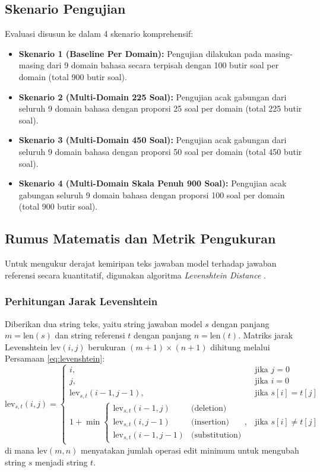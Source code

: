\documentclass[10pt,a4paper]{article}
\begin{document}
\subsection{Skenario Pengujian}
Evaluasi disusun ke dalam 4 skenario komprehensif:
\begin{itemize}\setlength{\itemsep}{0pt}\setlength{\parskip}{0pt}
    \item \textbf{Skenario 1 (Baseline Per Domain):} Pengujian dilakukan pada masing-masing dari 9 domain bahasa secara terpisah dengan 100 butir soal per domain (total 900 butir soal).
    \item \textbf{Skenario 2 (Multi-Domain 225 Soal):} Pengujian acak gabungan dari seluruh 9 domain bahasa dengan proporsi 25 soal per domain (total 225 butir soal).
    \item \textbf{Skenario 3 (Multi-Domain 450 Soal):} Pengujian acak gabungan dari seluruh 9 domain bahasa dengan proporsi 50 soal per domain (total 450 butir soal).
    \item \textbf{Skenario 4 (Multi-Domain Skala Penuh 900 Soal):} Pengujian acak gabungan seluruh 9 domain bahasa dengan proporsi 100 soal per domain (total 900 butir soal).
\end{itemize}

\subsection{Rumus Matematis dan Metrik Pengukuran}
Untuk mengukur derajat kemiripan teks jawaban model terhadap jawaban referensi secara kuantitatif, digunakan algoritma \textit{Levenshtein Distance} \cite{beernaerts2019method, berger2021levenshtein, petty2022new, sandamette2025penerapan}.

\subsubsection{Perhitungan Jarak Levenshtein}
Diberikan dua string teks, yaitu string jawaban model $s$ dengan panjang $m = \text{len}(s)$ dan string referensi $t$ dengan panjang $n = \text{len}(t)$. Matriks jarak Levenshtein $\text{lev}(i, j)$ berukuran $(m+1) \times (n+1)$ dihitung melalui Persamaan \eqref{eq:levenshtein}:
\begin{equation}
\text{lev}_{s,t}(i, j) = \begin{cases} 
i, & \text{jika } j = 0 \\
j, & \text{jika } i = 0 \\
\text{lev}_{s,t}(i-1, j-1), & \text{jika } s[i] = t[j] \\
1 + \min \begin{cases} 
\text{lev}_{s,t}(i-1, j) & \text{(deletion)} \\
\text{lev}_{s,t}(i, j-1) & \text{(insertion)} \\
\text{lev}_{s,t}(i-1, j-1) & \text{(substitution)}
\end{cases}, & \text{jika } s[i] \ne t[j]
\end{cases}
\label{eq:levenshtein}
\end{equation}
di mana $\text{lev}(m, n)$ menyatakan jumlah operasi edit minimum untuk mengubah string $s$ menjadi string $t$.
\end{document}
